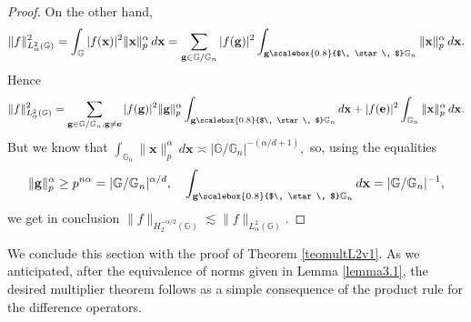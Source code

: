 \documentclass[12pt, reqno]{amsart}
\newcommand{\1}{\mathds{1}}
\newcommand{\G}{\mathbb{G}}
\newcommand{\smallstar}{\scalebox{0.8}{$\, \star \, $}}
\begin{document}
\begin{proof}
On the other hand,
\[
\|f\|^2_{L^2_\alpha(\mathbb{G})} 
= \int_{\mathbb{G}} |f(\mathbf{x})|^2 \|\mathbf{x}\|^\alpha_p \, d\mathbf{x}
= \sum_{\mathbf{g} \in \G / \mathbb{G}_n} |f(\mathbf{g})|^2 \int_{\mathbf{g} \smallstar \mathbb{G}_n} \|\mathbf{x}\|^\alpha_p \, d\mathbf{x}.
\]
Hence
\[
\|f\|^2_{L^2_\alpha(\mathbb{G})}
= \sum_{\mathbf{g} \in \mathbb{G} / \mathbb{G}_n, \mathbf{g} \neq \mathbf{e}} |f(\mathbf{g})|^2 \|\mathbf{g}\|^\alpha_p \int_{\mathbf{g} \smallstar \mathbb{G}_n} d\mathbf{x}
+ |f(\mathbf{e})|^2 \int_{\mathbb{G}_n} \|\mathbf{x}\|^\alpha_p \, d\mathbf{x}.
\]
But we know that $\int_{\mathbb{G}_n} \|\mathbf{x}\|^\alpha_p \, d\mathbf{x} \asymp |\mathbb{G} / \mathbb{G}_n|^{-(\alpha/d+1)},$ so, using the equalities $$\| \mathbf{g} \|_p^\alpha \geq p^{n \alpha} = |\G / \G_n|^{\alpha/d}, \quad \int_{\mathbf{g} \smallstar \mathbb{G}_n} d\mathbf{x} = |\G / \G_n|^{-1}, $$
we get in conclusion $\|f\|_{H^{-\alpha/2}_2(\mathbb{G})} \lesssim \|f\|_{L^2_\alpha(\mathbb{G})}.$

\end{proof}


We conclude this section with the proof of Theorem \ref{teomultL2v1}. As we anticipated, after the equivalence of norms given in Lemma \ref{lemma3.1}, the desired multiplier theorem follows as a simple consequence of the product rule for the difference operators. 
\end{document}

